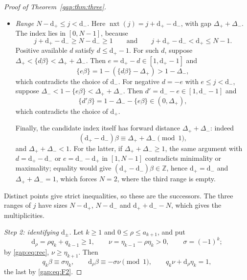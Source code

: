 \begin{proof}[Proof of Theorem~\ref{gap:thm:three}]
\begin{enumerate}
\begin{itemize}
\[ \]
 which contradicts the choice of $\mathrm d_-$.
 \item \emph{Range $N-\mathrm d_+\le j<\mathrm d_-$.} Here $\operatorname{nxt}(j)=j+\mathrm d_+-\mathrm d_-$, with gap $\Delta_++\Delta_-$.
 The index lies in $[0,N-1]$, because
 \[
 j+\mathrm d_+-\mathrm d_-\ge N-\mathrm d_-\ge1
 \qquad\text{and}\qquad
 j+\mathrm d_+-\mathrm d_-<\mathrm d_+\le N-1.
 \]
 Positive available $d$ satisfy $d\le\mathrm d_+-1$. For such $d$, suppose $\Delta_+<\{d\beta\}<\Delta_++\Delta_-$.
 Then $e=\mathrm d_+-d\in[1,\mathrm d_+-1]$ and
 \[
 \{e\beta\}=1-(\{d\beta\}-\Delta_+)>1-\Delta_-,
 \]
 which contradicts the choice of $\mathrm d_-$.
 For negative $d=-e$ with $e\le j<\mathrm d_-$, suppose $\Delta_-<1-\{e\beta\}<\Delta_++\Delta_-$.
 Then $d'=\mathrm d_--e\in[1,\mathrm d_--1]$ and
 \[
 \{d'\beta\}=1-\Delta_--\{e\beta\}\in(0,\Delta_+),
 \]
 which contradicts the choice of $\mathrm d_+$.

 Finally, the candidate index itself has forward distance $\Delta_++\Delta_-$: indeed
 \[
 (\mathrm d_+-\mathrm d_-)\beta\equiv\Delta_++\Delta_-\pmod1,
 \]
 and $\Delta_++\Delta_-<1$. For the latter, if $\Delta_++\Delta_-\ge1$, the same argument with $d=\mathrm d_+-\mathrm d_-$ or $e=\mathrm d_--\mathrm d_+$ in $[1,N-1]$ contradicts minimality or maximality; equality would give $(\mathrm d_+-\mathrm d_-)\beta\in\mathbb Z$, hence $\mathrm d_+=\mathrm d_-$ and $\Delta_++\Delta_-=1$, which forces $N=2$, where the third range is empty.
 \end{itemize}
Distinct points give strict inequalities, so these are the successors. The three ranges of $j$ have sizes
$N-\mathrm d_+$, $N-\mathrm d_-$ and $\mathrm d_++\mathrm d_--N$, which gives the multiplicities.
\end{enumerate}

\emph{Step 2: identifying $\mathrm d_\pm$.} Let $k\ge1$ and $0\le\rho\le a_{k+1}$, and put
\[
\mathrm d_\rho=\rho q_k+q_{k-1}\ge1,\qquad
\nu=\eta_{k-1}-\rho\eta_k>0,\qquad
\sigma=(-1)^k;
\]
by \eqref{gap:eq:rec}, $\nu\ge\eta_{k+1}$. Then
\begin{equation}\label{gap:eq:step2}
q_k\beta\equiv\sigma\eta_k,\qquad \mathrm d_\rho\beta\equiv-\sigma\nu\pmod1,\qquad
q_k\nu+\mathrm d_\rho\eta_k=1,
\end{equation}
the last by \eqref{gap:eq:F2}.


\end{proof}
